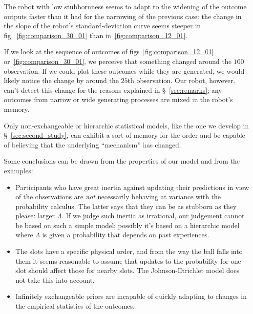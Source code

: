 \documentclass[\ifafour a4paper,12pt,\else a5paper,10pt,\fi%
onecolumn,oneside,article,%
british%
]{memoir}
\theoremstyle{remark}
\theoremstyle{innote}
\renewcommand*{\|}{\mathpunct{|}}
\newcommand*{\sect}{\S}%
\newcommand*{\fig}{fig.}%
\newcommand*{\figs}{figs}%
\newcommand*{\yN}{\varLambda}
\begin{document}
The robot with low stubbornness seems to adapt to the widening of the
outcome outputs faster than it had for the narrowing of the previous case:
the change in the slope of the robot's standard-deviation curve seems
steeper in \fig~\ref{fig:comparison_30_01} than
in~\ref{fig:comparison_12_01}.


If we look at the sequence of outcomes of \figs~\ref{fig:comparison_12_01}
or~\ref{fig:comparison_30_01}, we perceive that something changed around
the $100$ observation. If we could plot these outcomes while they are
generated, we would likely notice the change by around the $25$th
observation. Our robot, however, can't detect this change for the reasons
explained in \sect~\ref{sec:remarks}; any outcomes from narrow or wide
generating processes are mixed in the robot's memory.

Only non-exchangeable or hierarchic statistical models, like the one we
develop in \sect~\ref{sec:second_study}, can exhibit a sort of memory for
the order and be capable of believing that the underlying
\enquote{mechanism} has changed.

\bigskip


Some conclusions can be drawn from the properties of our model and from the
examples:
\begin{itemize}[para]
\item Participants who have great inertia against updating their
  predictions in view of the observations are \emph{not} necessarily
  behaving at variance with the probability calculus. The latter says that
  they can be as stubborn as they please: larger $\yN$. If we judge such
  inertia as irrational, our judgement cannot be based on such a simple
  model; possibly it's based on a hierarchic model where $\yN$ is given a
  probability that depends on past experiences.

\item The slots have a specific physical order, and from the way the ball
  falls into them it seems reasonable to assume that updates to the
  probability for one slot should affect those for nearby slots. The
  Johnson-Dirichlet model does not take this into account. 

\item Infinitely exchangeable priors are incapable of quickly adapting to
  changes in the empirical statistics of the outcomes.
\end{itemize}
\end{document}
